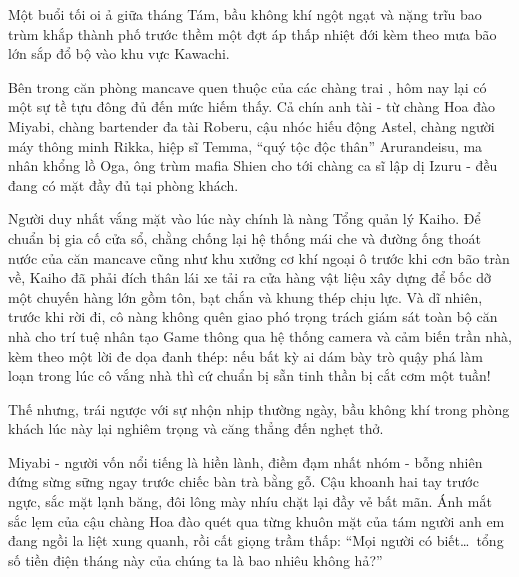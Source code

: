 \documentclass[../main.tex]{subfiles}
\begin{document}

Một buổi tối oi ả giữa tháng Tám, bầu không khí ngột ngạt và nặng trĩu bao trùm khắp thành phố trước thềm một đợt áp thấp nhiệt đới kèm theo mưa bão lớn sắp đổ bộ vào khu vực Kawachi.

Bên trong căn phòng mancave quen thuộc của các chàng trai \hls, hôm nay lại có một sự tề tựu đông đủ đến mức hiếm thấy. Cả chín anh tài - từ chàng Hoa đào Miyabi, chàng bartender đa tài Roberu, cậu nhóc hiếu động Astel, chàng người máy thông minh Rikka, hiệp sĩ Temma, ``quý tộc độc thân'' Arurandeisu, ma nhân khổng lồ Oga, ông trùm mafia Shien cho tới chàng ca sĩ lập dị Izuru - đều đang có mặt đầy đủ tại phòng khách.

Người duy nhất vắng mặt vào lúc này chính là nàng Tổng quản lý Kaiho. Để chuẩn bị gia cố cửa sổ, chằng chống lại hệ thống mái che và đường ống thoát nước của căn mancave cũng như khu xưởng cơ khí ngoại ô trước khi cơn bão tràn về, Kaiho đã phải đích thân lái xe tải ra cửa hàng vật liệu xây dựng để bốc dỡ một chuyến hàng lớn gồm tôn, bạt chắn và khung thép chịu lực. Và dĩ nhiên, trước khi rời đi, cô nàng không quên giao phó trọng trách giám sát toàn bộ căn nhà cho trí tuệ nhân tạo Game thông qua hệ thống camera và cảm biến trần nhà, kèm theo một lời đe dọa đanh thép: nếu bất kỳ ai dám bày trò quậy phá làm loạn trong lúc cô vắng nhà thì cứ chuẩn bị sẵn tinh thần bị cắt cơm một tuần!

Thế nhưng, trái ngược với sự nhộn nhịp thường ngày, bầu không khí trong phòng khách lúc này lại nghiêm trọng và căng thẳng đến nghẹt thở.

Miyabi - người vốn nổi tiếng là hiền lành, điềm đạm nhất nhóm - bỗng nhiên đứng sừng sững ngay trước chiếc bàn trà bằng gỗ. Cậu khoanh hai tay trước ngực, sắc mặt lạnh băng, đôi lông mày nhíu chặt lại đầy vẻ bất mãn. Ánh mắt sắc lẹm của cậu chàng Hoa đào quét qua từng khuôn mặt của tám người anh em đang ngồi la liệt xung quanh, rồi cất giọng trầm thấp: ``Mọi người có biết\dots\ tổng số tiền điện tháng này của chúng ta là bao nhiêu không hả?''
\end{document}
